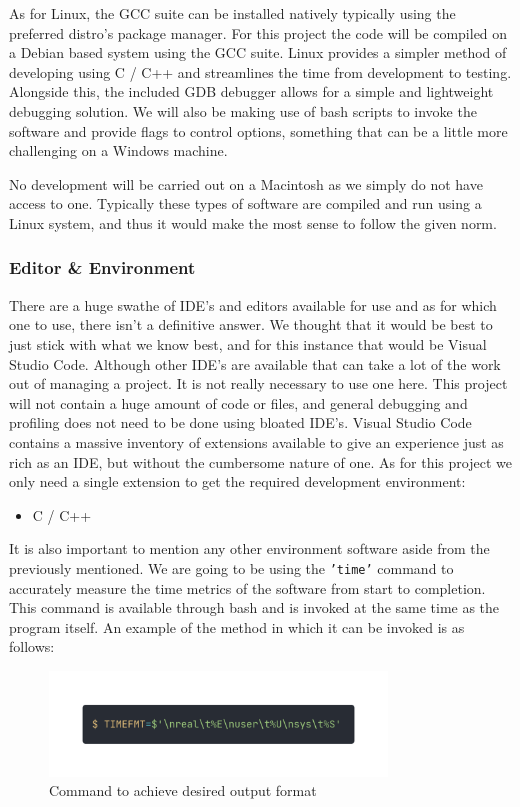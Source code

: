 \documentclass{article}
\begin{document}
As for Linux, the GCC suite can be installed natively typically using the preferred distro's package manager. For this project the code will be compiled on a Debian based system using the GCC suite. Linux provides a simpler method of developing using C / C++ and streamlines the time from development to testing. Alongside this, the included GDB debugger allows for a simple and lightweight debugging solution. We will also be making use of bash scripts to invoke the software and provide flags to control options, something that can be a little more challenging on a Windows machine.

No development will be carried out on a Macintosh as we simply do not have access to one. Typically these types of software are compiled and run using a Linux system, and thus it would make the most sense to follow the given norm.

\subsubsection{Editor \& Environment}
There are a huge swathe of IDE's and editors available for use and as for which one to use, there isn't a definitive answer. We thought that it would be best to just stick with what we know best, and for this instance that would be Visual Studio Code. Although other IDE's are available that can take a lot of the work out of managing a project. It is not really necessary to use one here. This project will not contain a huge amount of code or files, and general debugging and profiling does not need to be done using bloated IDE's. Visual Studio Code contains a massive inventory of extensions available to give an experience just as rich as an IDE, but without the cumbersome nature of one. As for this project we only need a single extension to get the required development environment:

\begin{itemize}
    \item C / C++
\end{itemize}

It is also important to mention any other environment software aside from the previously mentioned. We are going to be using the \texttt{'time'} command to accurately measure the time metrics of the software from start to completion. This command is available through bash and is invoked at the same time as the program itself. An example of the method in which it can be invoked is as follows:

\begin{figure}[h]
    \centering
    \includegraphics[width=0.8\textwidth]{time_command_format.png}
    \caption{Command to achieve desired output format}
\end{figure}
\end{document}
